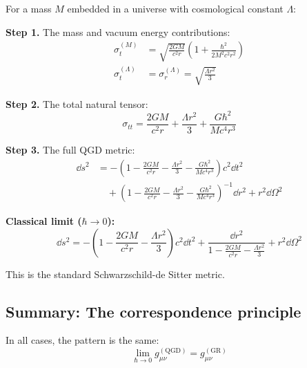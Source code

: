 \documentclass[11pt,a4paper]{article}
\theoremstyle{definition}
\theoremstyle{remark}
\begin{document}
	For a mass $M$ embedded in a universe with cosmological constant $\Lambda$:
	
	\textbf{Step 1.} The mass and vacuum energy contributions:
	\begin{align}
		\sigma^{(M)}_t &= \sqrt{\frac{2GM}{c^2 r}}\left(1 + \frac{\hbar^2}{2M^2 c^2 r^2}\right) \label{eq:sigma_mass_sds} \\
		\sigma^{(\Lambda)}_t &= \sigma^{(\Lambda)}_r = \sqrt{\frac{\Lambda r^2}{3}} \label{eq:sigma_lambda_sds}
	\end{align}
	
	\textbf{Step 2.} The total natural tensor:
	\begin{equation}
		\sigma_{tt} = \frac{2GM}{c^2 r} + \frac{\Lambda r^2}{3} + \frac{G\hbar^2}{Mc^4 r^3}
		\label{eq:sigma_tt_sds}
	\end{equation}
	
	\textbf{Step 3.} The full QGD metric:
	\begin{equation}
		\boxed{\begin{aligned}
				\dd s^2 &= -\left(1 - \frac{2GM}{c^2 r} - \frac{\Lambda r^2}{3} - \frac{G\hbar^2}{Mc^4 r^3}\right)c^2 \dd t^2 \\[4pt]
				&\quad + \left(1 - \frac{2GM}{c^2 r} - \frac{\Lambda r^2}{3} - \frac{G\hbar^2}{Mc^4 r^3}\right)^{-1}\dd r^2 + r^2 \dd\Omega^2
		\end{aligned}}
		\label{eq:sds_qgd}
	\end{equation}
	
	\textbf{Classical limit ($\hbar \to 0$):}
	\begin{equation}
		\dd s^2 = -\left(1 - \frac{2GM}{c^2 r} - \frac{\Lambda r^2}{3}\right)c^2 \dd t^2 + \frac{\dd r^2}{1 - \frac{2GM}{c^2 r} - \frac{\Lambda r^2}{3}} + r^2 \dd\Omega^2
		\label{eq:sds_classical}
	\end{equation}
	
	This is the standard Schwarzschild-de Sitter metric.
	
	\subsection{Summary: The correspondence principle}
	
	In all cases, the pattern is the same:
	\begin{equation}
		\lim_{\hbar \to 0} g_{\mu\nu}^{(\text{QGD})} = g_{\mu\nu}^{(\text{GR})}
		\label{eq:correspondence}
	\end{equation}
	
\end{document}
